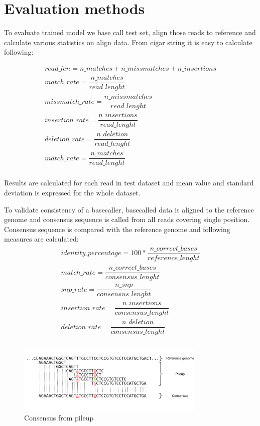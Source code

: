 \documentclass[times, utf8, diplomski, numeric, english]{fer}
\begin{document}
\section{Evaluation methods}
To evaluate trained model we base call test set, align those reads to reference and calculate various statistics on align data.
From cigar string it is easy to calculate following:

\begin{gather*}
read\_len =  n\_matches + n\_missmatches + n\_insertions \\
match\_rate = \dfrac{n\_matches}{read\_lenght} \\
missmatch\_rate = \dfrac{n\_missmatches}{read\_lenght}\\
insertion\_rate = \dfrac{n\_insertions}{read\_lenght}\\
deletion\_rate = \dfrac{n\_deletion}{read\_lenght}\\
match\_rate = \dfrac{n\_matches}{read\_lenght}\\
\end{gather*}

Results are calculated for each read in test dataset and mean value and standard deviation is expressed for the whole dataset.

To validate consistency of a basecaller, basecalled data is aligned to the reference genome and consensus sequence is called from all reads covering single position. Consensus sequence is compared with the reference genome and following measures are calculated:
\begin{gather*}
identity\_percentage =  100 * \dfrac{n\_correct\_bases}{reference\_lenght} \\
match\_rate = \dfrac{n\_correct\_bases}{consensus\_lenght} \\
snp\_rate = \dfrac{n\_snp}{consensus\_lenght}\\
insertion\_rate = \dfrac{n\_insertions}{consensus\_lenght}\\
deletion\_rate = \dfrac{n\_deletion}{consensus\_lenght}\\
\end{gather*}

\begin{figure}[!ht]
	\begin{center}
		\includegraphics[width=0.8\textwidth]{./imgs/consnesus.png}
		\caption{Consensus from pileup}
		\label{fg:consensus}
	\end{center}
\end{figure}
\end{document}
